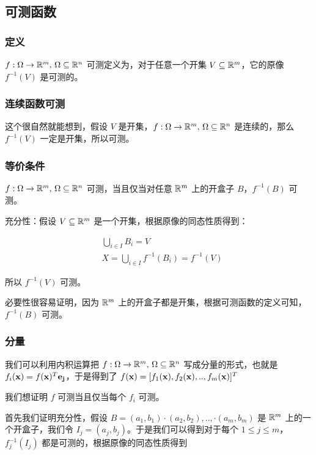 \renewcommand{\f}{f: \Omega \to \R^m,\, \Omega \subseteq \R^n }
\subsection{可测函数}

\subsubsection{定义}

$\f$ 可测定义为，对于任意一个开集 $V \subseteq \mathbb{R}^m$，它的原像 $f^{-1}(V)$ 是可测的。

\subsubsection{连续函数可测}

这个很自然就能想到，假设 $V$ 是开集，$\f$ 是连续的，那么 $f^{-1}(V)$ 一定是开集，所以可测。

\subsubsection{等价条件}

$\f$ 可测，当且仅当对任意 $\mathbb{R}^m$ 上的开盒子 $B$，$f^{-1}(B)$ 可测。

充分性：假设 $V \subseteq \mathbb{R}^m$ 是一个开集，根据原像的同态性质得到：

\begin{align*}
& \bigcup_{i \in I}B_i = V \\
& X = \bigcup_{i \in I}f^{-1}(B_i) = f^{-1}(V)
\end{align*}

所以 $f^{-1}(V)$ 可测。 

必要性很容易证明，因为 $\mathbb{R}^m$  上的开盒子都是开集，根据可测函数的定义可知， $f^{-1}(B)$ 可测。


\subsubsection{分量}

我们可以利用内积运算把 $\f$ 写成分量的形式，也就是 $f_i(\mathbf{x}) = f(\mathbf{x})^T \mathbf{e_j}$，于是得到了 
$f(\mathbf{x}) = [f_1(\mathbf{x}), f_2(\mathbf{x}), .., f_m(\mathbf{x})]^T $

我们想证明 $f$ 可测当且仅当每个 $f_i$ 可测。

首先我们证明充分性，假设 $B=(a_1,b_1) \cdot (a_2, b_2),.., \cdot(a_m,b_m)$ 是 $\mathbb{R}^m$ 上的一个开盒子，我们令 $I_j = (a_j, b_j)$。于是我们可以得到对于每个 $1 \le j \le m$，
$f_j^{-1}(I_j)$ 都是可测的，根据原像的同态性质得到

